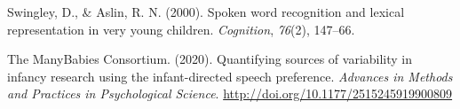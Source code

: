 \documentclass[10pt, letterpaper]{article}
\begin{document}
\leavevmode\hypertarget{ref-Swingley2000}{}%
Swingley, D., \& Aslin, R. N. (2000). Spoken word recognition and
lexical representation in very young children. \emph{Cognition},
\emph{76}(2), 147--66.

\leavevmode\hypertarget{ref-TheManyBabiesConsortium2020}{}%
The ManyBabies Consortium. (2020). Quantifying sources of variability in
infancy research using the infant-directed speech preference.
\emph{Advances in Methods and Practices in Psychological Science}.
\url{http://doi.org/10.1177/2515245919900809}


\end{document}
